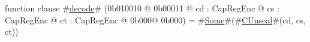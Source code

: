 function clause #\hyperref[zdecode]{decode}# (0b010010 @ 0b00011 @ cd : CapRegEnc @ cs : CapRegEnc @ ct : CapRegEnc @ 0b000@ 0b000) = #\hyperref[zSome]{Some}#(#\hyperref[zCUnseal]{CUnseal}#(cd, cs, ct))
